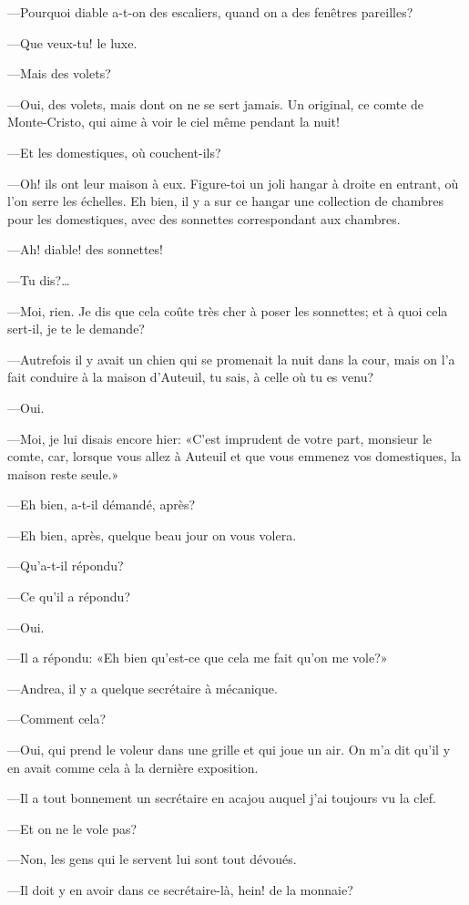 —Pourquoi diable a-t-on des escaliers, quand on a des fenêtres pareilles? 

—Que veux-tu! le luxe. 

—Mais des volets? 

—Oui, des volets, mais dont on ne se sert jamais. Un original, ce comte de Monte-Cristo, qui aime à voir le ciel même pendant la nuit! 

—Et les domestiques, où couchent-ils? 

—Oh! ils ont leur maison à eux. Figure-toi un joli hangar à droite en entrant, où l'on serre les échelles. Eh bien, il y a sur ce hangar une collection de chambres pour les domestiques, avec des sonnettes correspondant aux chambres. 

—Ah! diable! des sonnettes! 

—Tu dis?\dots 

—Moi, rien. Je dis que cela coûte très cher à poser les sonnettes; et à quoi cela sert-il, je te le demande? 

—Autrefois il y avait un chien qui se promenait la nuit dans la cour, mais on l'a fait conduire à la maison d'Auteuil, tu sais, à celle où tu es venu? 

—Oui. 

—Moi, je lui disais encore hier: «C'est imprudent de votre part, monsieur le comte, car, lorsque vous allez à Auteuil et que vous emmenez vos domestiques, la maison reste seule.» 

—Eh bien, a-t-il démandé, après? 

—Eh bien, après, quelque beau jour on vous volera. 

—Qu'a-t-il répondu? 

—Ce qu'il a répondu? 

—Oui. 

—Il a répondu: «Eh bien qu'est-ce que cela me fait qu'on me vole?» 

—Andrea, il y a quelque secrétaire à mécanique. 

—Comment cela? 

—Oui, qui prend le voleur dans une grille et qui joue un air. On m'a dit qu'il y en avait comme cela à la dernière exposition. 

—Il a tout bonnement un secrétaire en acajou auquel j'ai toujours vu la clef. 

—Et on ne le vole pas? 

—Non, les gens qui le servent lui sont tout dévoués. 

—Il doit y en avoir dans ce secrétaire-là, hein! de la monnaie? 

